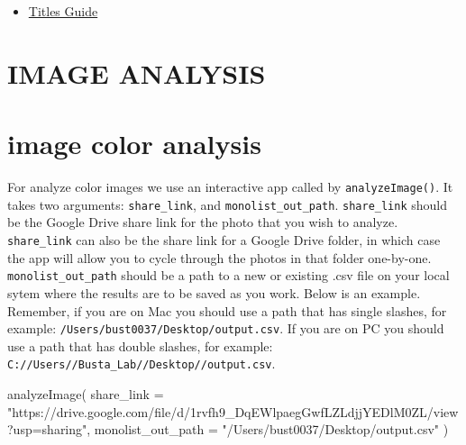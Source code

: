 \documentclass[
]{krantz}
\newenvironment{Shaded}{\begin{snugshade}}{\end{snugshade}}
\newcommand{\AttributeTok}[1]{\textcolor[rgb]{0.77,0.63,0.00}{#1}}
\newcommand{\FunctionTok}[1]{\textcolor[rgb]{0.00,0.00,0.00}{#1}}
\newcommand{\NormalTok}[1]{#1}
\newcommand{\StringTok}[1]{\textcolor[rgb]{0.31,0.60,0.02}{#1}}
\providecommand{\tightlist}{%
  \setlength{\itemsep}{0pt}\setlength{\parskip}{0pt}}
\begin{document}
\begin{itemize}
\tightlist
\item
  \href{https://libguides.usc.edu/writingguide/title}{Titles Guide}
\end{itemize}

\hypertarget{section-4}{%
\section*{}\label{section-4}}

\hypertarget{image-analysis}{%
\section*{IMAGE ANALYSIS}\label{image-analysis}}

\hypertarget{image-color-analysis}{%
\section{image color analysis}\label{image-color-analysis}}

For analyze color images we use an interactive app called by \texttt{analyzeImage()}. It takes two arguments: \texttt{share\_link}, and \texttt{monolist\_out\_path}. \texttt{share\_link} should be the Google Drive share link for the photo that you wish to analyze. \texttt{share\_link} can also be the share link for a Google Drive folder, in which case the app will allow you to cycle through the photos in that folder one-by-one. \texttt{monolist\_out\_path} should be a path to a new or existing .csv file on your local sytem where the results are to be saved as you work. Below is an example. Remember, if you are on Mac you should use a path that has single slashes, for example: \texttt{/Users/bust0037/Desktop/output.csv}. If you are on PC you should use a path that has double slashes, for example: \texttt{C://Users//Busta\_Lab//Desktop//output.csv}.

\begin{Shaded}
\begin{Highlighting}[]
\FunctionTok{analyzeImage}\NormalTok{(}
  \AttributeTok{share\_link =} \StringTok{"https://drive.google.com/file/d/1rvfh9\_DqEWlpaegGwfLZLdjjYEDlM0ZL/view?usp=sharing"}\NormalTok{,}
  \AttributeTok{monolist\_out\_path =} \StringTok{"/Users/bust0037/Desktop/output.csv"}
\NormalTok{)}
\end{Highlighting}
\end{Shaded}
\end{document}
